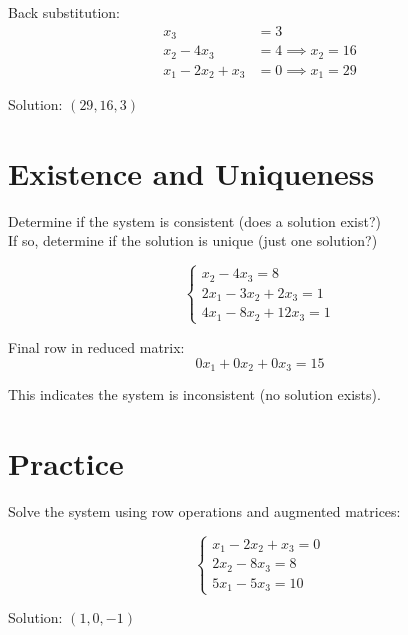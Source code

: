 \documentclass{article}
\begin{document}
Back substitution:
\vspace{0.5em}
\begin{align*}
x_3 &= 3 \\
x_2 - 4x_3 &= 4 \implies x_2 = 16 \\
x_1 - 2x_2 + x_3 &= 0 \implies x_1 = 29
\end{align*}
\vspace{0.5em}

Solution: $(29, 16, 3)$
\vspace{2em}

\section*{Existence and Uniqueness}
Determine if the system is consistent (does a solution exist?)\\ 
If so, determine if the solution is unique (just one solution?)
\vspace{1em}

\[
\begin{cases}
x_2 - 4x_3 = 8 \\
2x_1 - 3x_2 + 2x_3 = 1 \\
4x_1 - 8x_2 + 12x_3 = 1
\end{cases}
\]
\vspace{1em}

Final row in reduced matrix:
\vspace{0.5em}
\[
0x_1 + 0x_2 + 0x_3 = 15
\]
\vspace{0.5em}

This indicates the system is inconsistent (no solution exists).
\vspace{2em}

\section*{Practice}
Solve the system using row operations and augmented matrices:
\vspace{0.5em}

\[
\begin{cases}
x_1 - 2x_2 + x_3 = 0 \\
2x_2 - 8x_3 = 8 \\
5x_1 - 5x_3 = 10
\end{cases}
\]
\vspace{1em}

Solution: $(1, 0, -1)$
\end{document}
